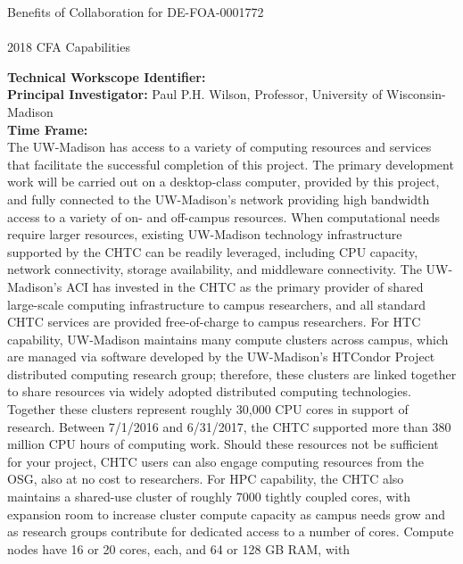 \documentclass[dvips,12pt]{article}
\begin{document}
\begin{centering}
  Benefits of Collaboration for DE-FOA-0001772\\
  \textbf{\large \mytitle}\\
  2018 CFA Capabilities \ID\\
\end{centering}
\vspace{1em}

\noindent\textbf{Technical Workscope Identifier:} \workscope\\
\textbf{Principal Investigator:} Paul P.H. Wilson, Professor, University of Wisconsin-Madison\\
\textbf{Time Frame:} \timeframe\\

The UW-Madison has access to a variety of computing resources and services
that facilitate the successful completion of this project.  The primary
development work will be carried out on a desktop-class computer, provided by
this project, and fully connected to the UW-Madison's network providing high
bandwidth access to a variety of on- and off-campus resources.  When
computational needs require larger resources, existing UW-Madison technology
infrastructure supported by the \gls{CHTC} can be readily leveraged, including
CPU capacity, network connectivity, storage availability, and middleware
connectivity. The UW-Madison's \gls{ACI} has invested in the \gls{CHTC} as the
primary provider of shared large-scale computing infrastructure to campus
researchers, and all standard \gls{CHTC} services are provided free-of-charge
to campus researchers. For \gls{HTC} capability,
UW-Madison maintains many compute clusters across campus, which are managed
via software developed by the UW-Madison's HTCondor Project distributed
computing research group; therefore, these clusters are linked together to
share resources via widely adopted distributed computing
technologies. Together these clusters represent roughly 30,000 CPU cores in
support of research. Between 7/1/2016 and 6/31/2017, the \gls{CHTC} supported
more than 380 million CPU hours of computing work. Should these resources not
be sufficient for your project, \gls{CHTC} users can also engage computing
resources from the \gls{OSG}, also at no cost to
researchers. For \gls{HPC} capability, the \gls{CHTC}
also maintains a shared-use cluster of roughly 7000 tightly coupled cores,
with expansion room to increase cluster compute capacity as campus needs grow
and as research groups contribute for dedicated access to a number of
cores. Compute nodes have 16 or 20 cores, each, and 64 or 128 GB RAM, with
\end{document}

